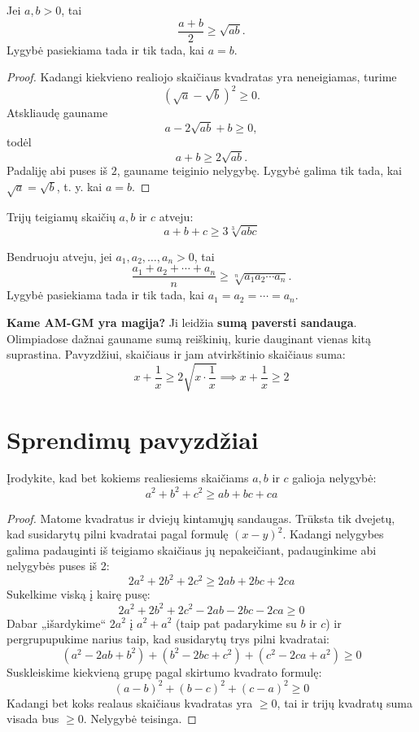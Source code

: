 \documentclass[11pt,a4paper]{scrartcl}
\begin{document}
\begin{proposition}
Jei $a, b > 0$, tai
$$ \frac{a+b}{2} \geq \sqrt{ab}. $$
Lygybė pasiekiama tada ir tik tada, kai $a=b$.
\end{proposition}

\begin{proof}
Kadangi kiekvieno realiojo skaičiaus kvadratas yra neneigiamas, turime
$$ (\sqrt{a}-\sqrt{b})^2 \geq 0. $$
Atskliaudę gauname
$$ a-2\sqrt{ab}+b \geq 0, $$
todėl
$$ a+b \geq 2\sqrt{ab}. $$
Padaliję abi puses iš $2$, gauname teiginio nelygybę. Lygybė galima tik tada, kai $\sqrt{a}=\sqrt{b}$, t. y. kai $a=b$.
\end{proof}

Trijų teigiamų skaičių $a, b$ ir $c$ atveju:
$$ a + b + c \ge 3\sqrt[3]{abc} $$

Bendruoju atveju, jei $a_1, a_2, \ldots, a_n > 0$, tai
$$
\frac{a_1+a_2+\cdots+a_n}{n}
\ge
\sqrt[n]{a_1a_2\cdots a_n}.
$$
Lygybė pasiekiama tada ir tik tada, kai $a_1=a_2=\cdots=a_n$.

\textbf{Kame AM-GM yra magija?} 
Ji leidžia \textbf{sumą paversti sandauga}. Olimpiadose dažnai gauname sumą reiškinių, kurie dauginant vienas kitą suprastina. Pavyzdžiui, skaičiaus ir jam atvirkštinio skaičiaus suma:
$$ x + \frac{1}{x} \ge 2\sqrt{x \cdot \frac{1}{x}} \implies x + \frac{1}{x} \ge 2 $$

\section{Sprendimų pavyzdžiai}

\begin{example}
Įrodykite, kad bet kokiems realiesiems skaičiams $a, b$ ir $c$ galioja nelygybė:
$$ a^2 + b^2 + c^2 \ge ab + bc + ca $$
\end{example}
\begin{proof}

Matome kvadratus ir dviejų kintamųjų sandaugas. Trūksta tik dvejetų, kad susidarytų pilni kvadratai pagal formulę $(x-y)^2$. Kadangi nelygybes galima padauginti iš teigiamo skaičiaus jų nepakeičiant, padauginkime abi nelygybės puses iš 2:
$$ 2a^2 + 2b^2 + 2c^2 \ge 2ab + 2bc + 2ca $$
Sukelkime viską į kairę pusę:
$$ 2a^2 + 2b^2 + 2c^2 - 2ab - 2bc - 2ca \ge 0 $$
Dabar „išardykime“ $2a^2$ į $a^2 + a^2$ (taip pat padarykime su $b$ ir $c$) ir pergrupupukime narius taip, kad susidarytų trys pilni kvadratai:
$$ (a^2 - 2ab + b^2) + (b^2 - 2bc + c^2) + (c^2 - 2ca + a^2) \ge 0 $$
Suskleiskime kiekvieną grupę pagal skirtumo kvadrato formulę:
$$ (a - b)^2 + (b - c)^2 + (c - a)^2 \ge 0 $$
Kadangi bet koks realaus skaičiaus kvadratas yra $\ge 0$, tai ir trijų kvadratų suma visada bus $\ge 0$. Nelygybė teisinga.
\end{proof}
\end{document}
